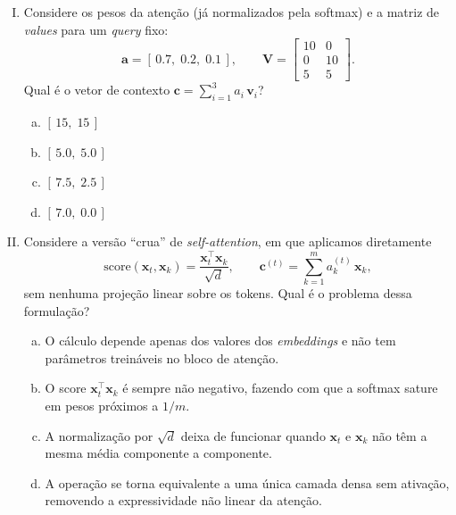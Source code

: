 \documentclass{dlproblemset}
\begin{document}
\begin{enumerate}[I)]
\begin{enumerate}[a)]
    \item $[5,\;3]$
    \item $[3,\;2]$
    \item $[3,\;5]$
    \item $[5,\;5]$
\end{enumerate}

\item Considere os pesos da atenção (já normalizados pela softmax) e a matriz
      de \textit{values} para um \textit{query} fixo:
      \[
        \mathbf{a} = [\,0.7,\; 0.2,\; 0.1\,], \qquad
        \mathbf{V} = \begin{bmatrix} 10 & 0 \\ 0 & 10 \\ 5 & 5 \end{bmatrix}.
      \]
      Qual é o vetor de contexto $\mathbf{c} = \sum_{i=1}^{3} a_i\, \mathbf{v}_i$?

\begin{enumerate}[a)]
    \item $[\,15,\;15\,]$
    \item $[\,5.0,\;5.0\,]$
    \item $[\,7.5,\;2.5\,]$
    \item $[\,7.0,\;0.0\,]$
\end{enumerate}

\item Considere a versão ``crua'' de \textit{self-attention}, em que aplicamos
      diretamente
      \[
        \mathrm{score}(\mathbf{x}_t, \mathbf{x}_k) = \frac{\mathbf{x}_t^\top \mathbf{x}_k}{\sqrt{d}}, \qquad
        \mathbf{c}^{(t)} = \sum_{k=1}^{m} a_k^{(t)}\, \mathbf{x}_k,
      \]
      sem nenhuma projeção linear sobre os tokens. Qual é o problema dessa
      formulação?

\begin{enumerate}[a)]
    \item O cálculo depende apenas dos valores dos \textit{embeddings} e não
          tem parâmetros treináveis no bloco de atenção.
    \item O score $\mathbf{x}_t^\top \mathbf{x}_k$ é sempre não negativo, fazendo com que a
          softmax sature em pesos próximos a $1/m$.
    \item A normalização por $\sqrt{d}$ deixa de funcionar quando $\mathbf{x}_t$ e
          $\mathbf{x}_k$ não têm a mesma média componente a componente.
    \item A operação se torna equivalente a uma única camada densa sem
          ativação, removendo a expressividade não linear da atenção.
\end{enumerate}


\end{enumerate}
\end{document}

